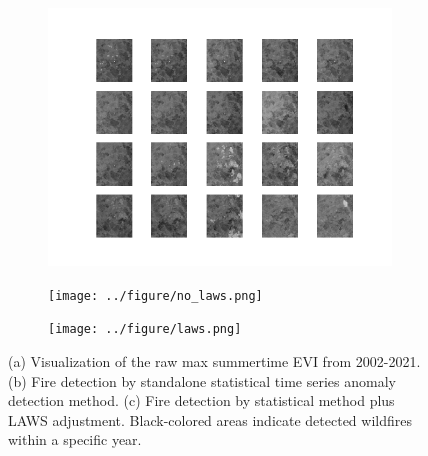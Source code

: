 \documentclass[11pt]{article}
\begin{document}
\begin{figure}[H]
     \centering
     
      \begin{subfigure}[b]{0.45\textwidth}
		\centering
		\includegraphics[width=\textwidth]{../figure/raw_data.png}
		\caption{}
	 \end{subfigure}
         \hfill
      \begin{subfigure}[b]{0.45\textwidth}
         \texttt{[image: ../figure/no\_laws.png]}
         \caption{}
     \end{subfigure}
     
      \begin{subfigure}[b]{0.45\textwidth}
         \texttt{[image: ../figure/laws.png]}
         \caption{}
     \end{subfigure}

     \caption{(a) Visualization of the raw max summertime EVI from 2002-2021. (b) Fire detection by standalone statistical time series anomaly detection method. (c) Fire detection by statistical method plus LAWS adjustment. Black-colored areas indicate detected wildfires within a specific year.}
      \label{fig:real_data}
\end{figure}
\end{document}
